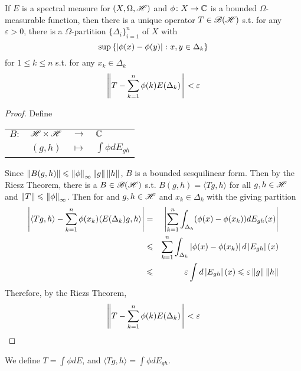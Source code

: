 \documentclass[a4paper,11pt]{report}
\begin{document}
\begin{thm}
	If $E$ is a spectral measure for $(X,\Omega,\mathscr{H})$ and $\phi \colon X \rightarrow \mathbb{C}$ is a bounded $\Omega$-measurable function, then there is a unique operator $T \in \mathscr{B(H)}$ s.t. for any $\varepsilon > 0$, there is a $\Omega$-partition $\{\Delta_i\}_{i=1}^{n}$ of $X$ with
	\begin{equation*}
		 \sup{\{\left\lvert\phi(x)-\phi(y)\right\lvert \colon x, y \in \Delta_k\}}
	\end{equation*}
	for $1 \leqslant k \leqslant n$ s.t. for any $x_k \in \Delta_k$
	\begin{equation*}
		\left\lVert T-\sum_{k=1}^{n}\phi(k)E(\Delta_k)\right\lVert < \varepsilon
	\end{equation*}
\end{thm}
\begin{proof}
	Define
	\begin{center}
		\begin{tabular}{l c c l}
			$B \colon$ & $\mathscr{H} \times \mathscr{H}$ & $\longrightarrow$ & $\mathbb{C}$ \\
			~ & $(g,h)$ & $\longmapsto$ & $\int \phi dE_{gh}$
		\end{tabular}
	\end{center}
	Since $\left\lVert B(g,h)\right\lVert \leqslant \left\lVert\phi\right\lVert_{\infty} \left\lVert g\right\lVert \left\lVert h\right\lVert$, $B$ is a bounded sesquilinear form. Then by the Riesz Theorem, there is a $B \in \mathscr{B(H)}$ s.t. $B(g,h) = \langle Tg,h \rangle$ for all $g,h \in \mathscr{H}$ and $\left\lVert T\right\lVert \leqslant \left\lVert\phi\right\lVert_{\infty}$. Then for and $g,h \in \mathscr{H}$ and $x_k \in \Delta_k$ with the giving partition
	\begin{eqnarray*}
		\left\lvert\langle Tg,h \rangle - \sum_{k=1}^{n}\phi(x_k)\langle E(\Delta_k)g, h \rangle\right\lvert &=& \left\lvert\sum_{k=1}^{n} \int_{\Delta_k} (\phi(x)-\phi(x_k))dE_{gh}(x)\right\lvert \\
		&\leqslant& \sum_{k=1}^{n} \int_{\Delta_k} \left\lvert\phi(x)-\phi(x_k)\right\lvert d\left\lvert E_{gh}\right\lvert(x) \\
		&\leqslant& \varepsilon \int d\left\lvert E_{gh}\right\lvert(x) \leqslant \varepsilon \left\lVert g\right\lVert\left\lVert h\right\lVert
	\end{eqnarray*}
	Therefore, by the Riezs Theorem, 
	\begin{equation*}
		\left\lVert T-\sum_{k=1}^{n}\phi(k)E(\Delta_k)\right\lVert < \varepsilon  \qedhere
	\end{equation*}
\end{proof}
\begin{rem}
	We define $T = \int \phi dE$, and $\langle Tg,h \rangle = \int \phi dE_{gh}$.
\end{rem}
\end{document}
